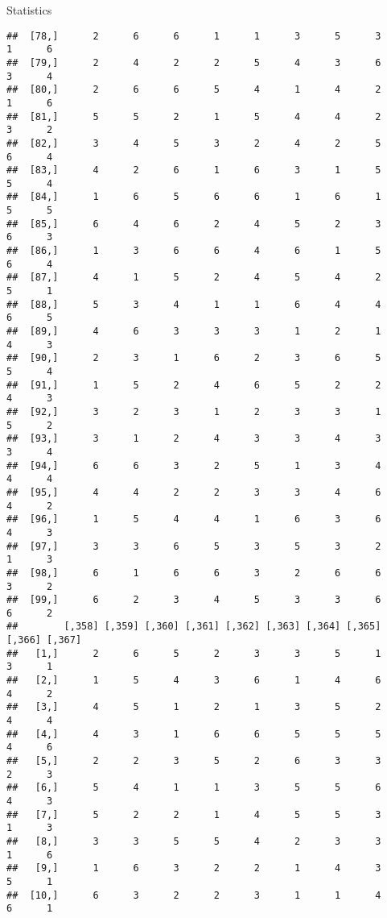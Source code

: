 \documentclass[
  ignorenonframetext,
]{beamer}
\begin{document}
\begin{frame}[fragile]{Statistics}
\begin{verbatim}
##  [78,]      2      6      6      1      1      3      5      3      1      6
##  [79,]      2      4      2      2      5      4      3      6      3      4
##  [80,]      2      6      6      5      4      1      4      2      1      6
##  [81,]      5      5      2      1      5      4      4      2      3      2
##  [82,]      3      4      5      3      2      4      2      5      6      4
##  [83,]      4      2      6      1      6      3      1      5      5      4
##  [84,]      1      6      5      6      6      1      6      1      5      5
##  [85,]      6      4      6      2      4      5      2      3      6      3
##  [86,]      1      3      6      6      4      6      1      5      6      4
##  [87,]      4      1      5      2      4      5      4      2      5      1
##  [88,]      5      3      4      1      1      6      4      4      6      5
##  [89,]      4      6      3      3      3      1      2      1      4      3
##  [90,]      2      3      1      6      2      3      6      5      5      4
##  [91,]      1      5      2      4      6      5      2      2      4      3
##  [92,]      3      2      3      1      2      3      3      1      5      2
##  [93,]      3      1      2      4      3      3      4      3      3      4
##  [94,]      6      6      3      2      5      1      3      4      4      4
##  [95,]      4      4      2      2      3      3      4      6      4      2
##  [96,]      1      5      4      4      1      6      3      6      4      3
##  [97,]      3      3      6      5      3      5      3      2      1      3
##  [98,]      6      1      6      6      3      2      6      6      3      2
##  [99,]      6      2      3      4      5      3      3      6      6      2
##        [,358] [,359] [,360] [,361] [,362] [,363] [,364] [,365] [,366] [,367]
##   [1,]      2      6      5      2      3      3      5      1      3      1
##   [2,]      1      5      4      3      6      1      4      6      4      2
##   [3,]      4      5      1      2      1      3      5      2      4      4
##   [4,]      4      3      1      6      6      5      5      5      4      6
##   [5,]      2      2      3      5      2      6      3      3      2      3
##   [6,]      5      4      1      1      3      5      5      6      4      3
##   [7,]      5      2      2      1      4      5      5      3      1      3
##   [8,]      3      3      5      5      4      2      3      3      1      6
##   [9,]      1      6      3      2      2      1      4      3      5      1
##  [10,]      6      3      2      2      3      1      1      4      6      1

\end{verbatim}
\end{frame}
\end{document}
